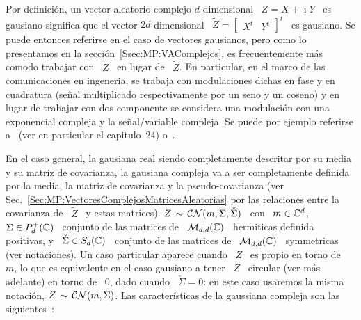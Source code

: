 \label{Sssec:MP:GaussianaComplejas}

Por definici\'on, un vector aleatorio complejo $d$-dimensional \ $Z = X + \imath
Y$ \  es gausiano significa que  el vector $2 d$-dimensional  \ $\widetilde{Z} =
\begin{bmatrix}  X^t &  Y^t \end{bmatrix}^t$  \ es  gausiano. Se  puede entonces
referirse  en el  caso de  vectores gausianos,  pero como  lo presentamos  en la
secci\'on~\ref{Ssec:MP:VAComplejos}, es frecuentemente m\'as comodo trabajar con
\  $Z$ \  en lugar  de \  $\widetilde{Z}$.  En  particular, en  el marco  de las
comunicaciones en  ingeneria, se  trabaja con modulaciones  dichas en fase  y en
cuadratura (se\~nal multiplicado  respectivamente por un seno y  un coseno) y en
lugar  de trabajar  con dos  componente se  considera una  modulaci\'on  con una
exponencial  compleja y  la  se\~nal/variable compleja.   Se  puede por  ejemplo
referirse  a~\cite{Lap17} (ver en  particular el  capitulo~24) o~\cite{SchSch03,
  EriKoi06}.

En el caso general, la gausiana real siendo completamente descritar por su media
y su matriz de covarianza, la  gausiana compleja va a ser completamente definida
por   la  media,   la  matriz   de  covarianza   y  la   pseudo-covarianza  (ver
Sec.~\ref{Sec:MP:VectoresComplejosMatricesAleatorias}  por las  relaciones entre
la  covarianza  de  \ $\widetilde{Z}$  \  y  estas  matrices).   $Z \,  \sim  \,
\mathcal{C}\mathcal{N}(m,\Sigma,\check{\Sigma})$  \   con  \  $m  \in  \mathbb{C}^d$,   \  $\Sigma  \in
P_d^+(\mathbb{C})$ \  conjunto de  las matrices de  \ $\mathcal{M}_{d,d}(\mathbb{C})$  \ hermiticas
definida  positivas, y  \  $\check{\Sigma}  \in S_d(\mathbb{C})$  \  conjunto de  las
matrices  de  \  $\mathcal{M}_{d,d}(\mathbb{C})$  \  symmetricas (ver  notaciones).   Un  caso
particular  aparece cuando  \ $Z$  \ es  propio en  torno de  \ $m$,  lo  que es
equivalente en el caso gausiano a tener \ $Z$ \ circular (ver m\'as adelante) en
torno de  \ $0$, dado cuando  \ $\check{\Sigma} =  0$: en este caso  usaremos la
misma notaci\'on,  $Z \, \sim  \, \mathcal{C}\mathcal{N}(m,\Sigma)$.  Las caracter\'isticas  de la
gaussiana  compleja   son  las  siguientes~\cite{Lap17,   Pic96,  Goo63,  Bos95,
  SchSch03, EriKoi06}:

